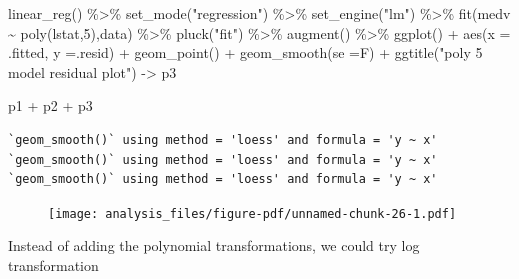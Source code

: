 \documentclass[
  letterpaper,
  DIV=11,
  numbers=noendperiod]{scrreprt}
\newenvironment{Shaded}{\begin{snugshade}}{\end{snugshade}}
\newcommand{\AttributeTok}[1]{\textcolor[rgb]{0.65,0.35,0.00}{#1}}
\newcommand{\DecValTok}[1]{\textcolor[rgb]{0.47,0.16,0.63}{#1}}
\newcommand{\FunctionTok}[1]{\textcolor[rgb]{0.02,0.16,0.49}{#1}}
\newcommand{\NormalTok}[1]{\textcolor[rgb]{0.33,0.33,0.33}{#1}}
\newcommand{\OtherTok}[1]{\textcolor[rgb]{0.85,0.12,0.09}{#1}}
\newcommand{\SpecialCharTok}[1]{\textcolor[rgb]{0.00,0.46,0.62}{#1}}
\newcommand{\StringTok}[1]{\textcolor[rgb]{0.00,0.50,0.00}{#1}}
\begin{document}
\begin{Shaded}
\begin{Highlighting}[]
\FunctionTok{linear\_reg}\NormalTok{() }\SpecialCharTok{\%\textgreater{}\%} 
  \FunctionTok{set\_mode}\NormalTok{(}\StringTok{"regression"}\NormalTok{) }\SpecialCharTok{\%\textgreater{}\%} 
  \FunctionTok{set\_engine}\NormalTok{(}\StringTok{"lm"}\NormalTok{) }\SpecialCharTok{\%\textgreater{}\%} 
  \FunctionTok{fit}\NormalTok{(medv }\SpecialCharTok{\textasciitilde{}} \FunctionTok{poly}\NormalTok{(lstat,}\DecValTok{5}\NormalTok{),data) }\SpecialCharTok{\%\textgreater{}\%} 
  \FunctionTok{pluck}\NormalTok{(}\StringTok{"fit"}\NormalTok{) }\SpecialCharTok{\%\textgreater{}\%} 
  \FunctionTok{augment}\NormalTok{() }\SpecialCharTok{\%\textgreater{}\%} 
  \FunctionTok{ggplot}\NormalTok{() }\SpecialCharTok{+} \FunctionTok{aes}\NormalTok{(}\AttributeTok{x =}\NormalTok{ .fitted, }\AttributeTok{y =}\NormalTok{.resid) }\SpecialCharTok{+} \FunctionTok{geom\_point}\NormalTok{() }\SpecialCharTok{+} \FunctionTok{geom\_smooth}\NormalTok{(}\AttributeTok{se =}\NormalTok{F) }\SpecialCharTok{+} \FunctionTok{ggtitle}\NormalTok{(}\StringTok{"poly 5 model residual plot"}\NormalTok{)  }\OtherTok{{-}\textgreater{}}\NormalTok{ p3}

\NormalTok{p1 }\SpecialCharTok{+}\NormalTok{ p2 }\SpecialCharTok{+}\NormalTok{ p3}
\end{Highlighting}
\end{Shaded}

\begin{verbatim}
`geom_smooth()` using method = 'loess' and formula = 'y ~ x'
`geom_smooth()` using method = 'loess' and formula = 'y ~ x'
`geom_smooth()` using method = 'loess' and formula = 'y ~ x'
\end{verbatim}

\begin{figure}[H]

{\centering \texttt{[image: analysis\_files/figure-pdf/unnamed-chunk-26-1.pdf]}

}

\end{figure}

Instead of adding the polynomial transformations, we could try log
transformation
\end{document}
